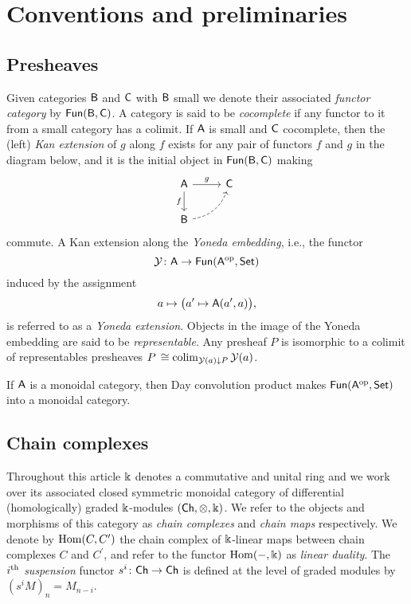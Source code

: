 
\section{Conventions and preliminaries}\label{s:preliminaries}

\subsection{Presheaves}

Given categories $\mathsf{B}$ and $\mathsf{C}$ with $\mathsf{B}$ small we denote their associated \textit{functor category} by $\mathsf{Fun}(\mathsf{B}, \mathsf{C})$.
A category is said to be \textit{cocomplete} if any functor to it from a small category has a colimit.
If $\mathsf{A}$ is small and $\mathsf{C}$ cocomplete, then the (left) \textit{Kan extension} of $g$ along $f$ exists for any pair of functors $f$ and $g$ in the diagram below, and it is the initial object in $\mathsf{Fun}(\mathsf{B}, \mathsf{C})$ making
\begin{equation*}
	\begin{tikzcd}[column sep=normal, row sep=normal]
		\sA \arrow[d, "f"'] \arrow[r, "g"] & \sC \\
		\sB \arrow[dashed, ur, bend right] & \quad
	\end{tikzcd}
\end{equation*}
commute.
A Kan extension along the \textit{Yoneda embedding}, i.e., the functor
\[
\operatorname{\mathcal{Y}} \colon \mathsf{A} \to \mathsf{Fun}(\mathsf{A}^{\mathrm{op}}, \mathsf{Set})
\]
induced by the assignment
\[
a \mapsto \big(a^\prime \mapsto \mathsf{A}(a^\prime, a)\big),
\]
is referred to as a \textit{Yoneda extension}.
Objects in the image of the Yoneda embedding are said to be \textit{representable}.
Any presheaf $P$ is isomorphic to a colimit of representables presheaves $P \, \cong \operatorname*{colim}_{\operatorname{\mathcal{Y}}(a) \downarrow P} \operatorname{\mathcal{Y}}(a)$.

If $\mathsf{A}$ is a monoidal category, then Day convolution product makes $\mathsf{Fun}(\mathsf{A}^{\mathrm{op}}, \mathsf{Set})$ into a monoidal category.

\subsection{Chain complexes}

Throughout this article $\Bbbk$ denotes a commutative and unital ring and we work over its associated closed symmetric monoidal category of differential (homologically) graded $\Bbbk$-modules $(\mathsf{Ch}, \otimes, \Bbbk)$.
We refer to the objects and morphisms of this category as \textit{chain complexes} and \textit{chain maps} respectively.
We denote by $\mathrm{Hom}(C, C^\prime)$ the chain complex of $\Bbbk$-linear maps between chain complexes $C$ and $C^\prime$, and refer to the functor $\mathrm{Hom}(-, \Bbbk)$ as \textit{linear duality}.
The $i^{\mathrm{th}}$ \textit{suspension} functor $s^i \colon \mathsf{Ch} \to \mathsf{Ch}$ is defined at the level of graded modules by $(s^{i}M)_n = M_{n-i}$.

